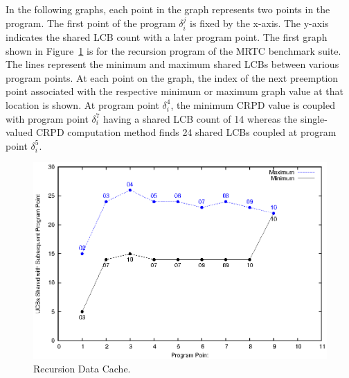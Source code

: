 In the following graphs, each point in the graph represents two points in the program. The first point of the program ${\delta_i^j}$ is fixed by the x-axis. The y-axis indicates the shared LCB count with a later program
point. The first graph shown in Figure~\ref{fig:recusion_data_cache} is for the recursion program of the MRTC benchmark suite.  The lines represent the minimum and maximum shared LCBs between various program points.
At each point on the graph, the index of the next preemption point associated with the respective minimum or maximum graph value at that location is shown.  At program point ${\delta_i^4}$, the minimum CRPD value is coupled with program point ${\delta_i^7}$ having a shared LCB count of 14 whereas the single-valued CRPD computation method finds 24 shared LCBs coupled at program point ${\delta_i^5}$.
%
\begin{figure}[h!]
\vspace{-10pt}
\begin{center}
\includegraphics[width=\linewidth]{eps/recursion-dcache.eps}
\caption{Recursion Data Cache.}
\label{fig:recusion_data_cache}
\end{center}
\vspace{-10pt}
\end{figure}

